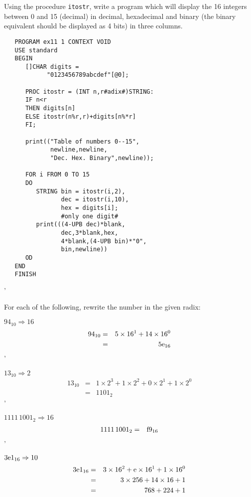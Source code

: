 \begin{exercise}
\item Using the procedure \verb|itostr|, write a program which will
display the 16 integers between 0 and 15 (decimal) in decimal,
hexadecimal and binary (the binary equivalent should be displayed as 4
bits) in three columns. \ans \ %
\begin{verbatim}
   PROGRAM ex11 1 CONTEXT VOID
   USE standard
   BEGIN
      []CHAR digits =
            "0123456789abcdef"[@0];

      PROC itostr = (INT n,r#adix#)STRING:
      IF n<r
      THEN digits[n]
      ELSE itostr(n%r,r)+digits[n%*r]
      FI;

      print(("Table of numbers 0--15",
             newline,newline,
             "Dec. Hex. Binary",newline));

      FOR i FROM 0 TO 15
      DO
         STRING bin = itostr(i,2),
                dec = itostr(i,10),
                hex = digits[i];
                #only one digit#
         print(((4-UPB dec)*blank,
                dec,3*blank,hex,
                4*blank,(4-UPB bin)*"0",
                bin,newline))
      OD
   END
   FINISH
\end{verbatim}
'
\item For each of the following, rewrite the number in the given radix:
\begin{subex}
\item $94_{10}\Rightarrow16$ \subans \begin{eqnarray*}
94_{10}&=&5\times16^1+14\times16^0\\
       &=&5\hbox{e}_{16}
\end{eqnarray*}
'
\item $13_{10}\Rightarrow2$ \subans \begin{eqnarray*}
13_{10}&=&1\times2^3+1\times2^2+0\times2^1+1\times2^0\\
       &=&1101_2
\end{eqnarray*}
'
\item $1111\,1001_2\Rightarrow16$ \subans \begin{eqnarray*}
1111\,1001_2&=&\hbox{f}9_{16}
\end{eqnarray*}
'
\item $3\hbox{e}1_{16}\Rightarrow 10$ \subans \begin{eqnarray*}
3\hbox{e}1_{16}&=&3\times16^2+\hbox{e}\times16^1+1\times16^0\\
               &=&3\times256+14\times16+1\\
               &=&768+224+1\\

\end{eqnarray*}
\end{subex}
\end{exercise}
